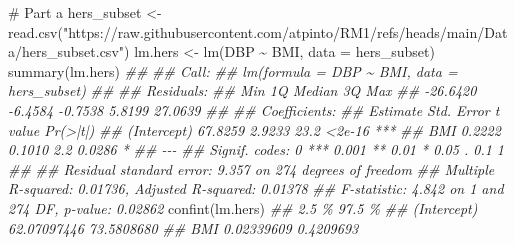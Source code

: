 \documentclass[
  letterpaper,
  DIV=11,
  numbers=noendperiod]{scrreprt}
\newenvironment{Shaded}{\begin{snugshade}}{\end{snugshade}}
\newcommand{\AttributeTok}[1]{\textcolor[rgb]{0.40,0.45,0.13}{#1}}
\newcommand{\CommentTok}[1]{\textcolor[rgb]{0.37,0.37,0.37}{#1}}
\newcommand{\DocumentationTok}[1]{\textcolor[rgb]{0.37,0.37,0.37}{\textit{#1}}}
\newcommand{\FunctionTok}[1]{\textcolor[rgb]{0.28,0.35,0.67}{#1}}
\newcommand{\NormalTok}[1]{\textcolor[rgb]{0.00,0.23,0.31}{#1}}
\newcommand{\OtherTok}[1]{\textcolor[rgb]{0.00,0.23,0.31}{#1}}
\newcommand{\SpecialCharTok}[1]{\textcolor[rgb]{0.37,0.37,0.37}{#1}}
\newcommand{\StringTok}[1]{\textcolor[rgb]{0.13,0.47,0.30}{#1}}
\begin{document}
\begin{Shaded}
\begin{Highlighting}[]
\CommentTok{\# Part a}
\NormalTok{hers\_subset }\OtherTok{\textless{}{-}} \FunctionTok{read.csv}\NormalTok{(}\StringTok{"https://raw.githubusercontent.com/atpinto/RM1/refs/heads/main/Data/hers\_subset.csv"}\NormalTok{)}
\NormalTok{lm.hers }\OtherTok{\textless{}{-}} \FunctionTok{lm}\NormalTok{(DBP }\SpecialCharTok{\textasciitilde{}}\NormalTok{ BMI, }\AttributeTok{data =}\NormalTok{ hers\_subset)}
\FunctionTok{summary}\NormalTok{(lm.hers)}
\DocumentationTok{\#\# }
\DocumentationTok{\#\# Call:}
\DocumentationTok{\#\# lm(formula = DBP \textasciitilde{} BMI, data = hers\_subset)}
\DocumentationTok{\#\# }
\DocumentationTok{\#\# Residuals:}
\DocumentationTok{\#\#      Min       1Q   Median       3Q      Max }
\DocumentationTok{\#\# {-}26.6420  {-}6.4584  {-}0.7538   5.8199  27.0639 }
\DocumentationTok{\#\# }
\DocumentationTok{\#\# Coefficients:}
\DocumentationTok{\#\#             Estimate Std. Error t value Pr(\textgreater{}|t|)    }
\DocumentationTok{\#\# (Intercept)  67.8259     2.9233    23.2   \textless{}2e{-}16 ***}
\DocumentationTok{\#\# BMI           0.2222     0.1010     2.2   0.0286 *  }
\DocumentationTok{\#\# {-}{-}{-}}
\DocumentationTok{\#\# Signif. codes:  0 \textquotesingle{}***\textquotesingle{} 0.001 \textquotesingle{}**\textquotesingle{} 0.01 \textquotesingle{}*\textquotesingle{} 0.05 \textquotesingle{}.\textquotesingle{} 0.1 \textquotesingle{} \textquotesingle{} 1}
\DocumentationTok{\#\# }
\DocumentationTok{\#\# Residual standard error: 9.357 on 274 degrees of freedom}
\DocumentationTok{\#\# Multiple R{-}squared:  0.01736,    Adjusted R{-}squared:  0.01378 }
\DocumentationTok{\#\# F{-}statistic: 4.842 on 1 and 274 DF,  p{-}value: 0.02862}
\FunctionTok{confint}\NormalTok{(lm.hers)}
\DocumentationTok{\#\#                   2.5 \%     97.5 \%}
\DocumentationTok{\#\# (Intercept) 62.07097446 73.5808680}
\DocumentationTok{\#\# BMI          0.02339609  0.4209693}


\end{Highlighting}
\end{Shaded}
\end{document}

